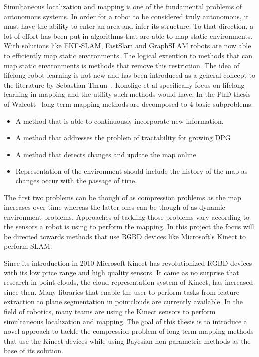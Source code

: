 \documentclass[twoside,hidelinks]{article}
\begin{document}
Simultaneous localization and mapping is one of the fundamental problems of autonomous systems\cite{probRobs}. In order for a robot to be considered truly autonomous, it must have the ability to enter an area and infer its structure. To that direction, a lot of effort has been put in algorithms that are able to map static environments. With solutions like EKF-SLAM\cite{ekf}, FastSlam\cite{slam} and GraphSLAM\cite{graph} robots are now able to efficiently map static environments. 
The logical extention to methods that can map  static environments is methods that remove this restriction. The idea of lifelong robot learning is not new and has been introduced as a general concept to the literature by Sebastian Thrun~\cite{liflonglearning}. Konolige et al\cite{lifelongmaps} specifically focus on lifelong learning in mapping and the utility such methods would have.  In the PhD thesis of Walcott~\cite{aishalong} long term mapping methods are decomposed to 4 basic subproblems:
\begin{itemize}
	\item{A method that is able to continuously incorporate new information.}
	\item{A method that addresses the problem of tractability for growing DPG}
	\item{A method that detects changes and update the map online}
	\item{Representation of the environment should include the history of the map as changes occur	with the passage of time.}
\end{itemize}

The first two problems can be though of as compression problems as the map increases over time whereas the latter ones can be though of as dynamic environment problems. Approaches of tackling those problems vary according to the sensors a robot is using to perform the mapping. In this project the focus will be directed towards methods that use RGBD devices like Microsoft's Kinect to perform SLAM.

Since its introduction in 2010 Microsoft Kinect\cite{kinect} has revolutionized RGBD devices with its low price range and high quality sensors. It came as no surprise that research in point clouds, the cloud representation system of Kinect, has increased since then. Many libraries that enable the user to perform tasks from feature extraction to plane segmentation\cite{pcl} in pointclouds are currently available. In the field of robotics, many teams are using the Kinect sensors to perform simultaneous localization and mapping\cite{rtabmap}. The goal of this thesis is to introduce a novel approach to tackle the compression problem of long term mapping methods that use the Kinect devices while using Bayesian non parametric methods as the base of its solution.
\end{document}
